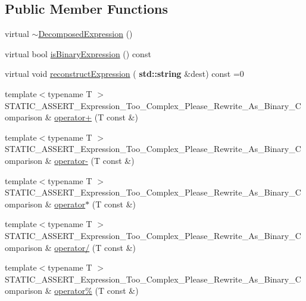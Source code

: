 \subsection*{Public Member Functions}
\begin{DoxyCompactItemize}
\item 
virtual \hyperlink{struct_catch_1_1_decomposed_expression_aa627c69bd83582c33a4d4dcac403936c}{$\sim$\+Decomposed\+Expression} ()
\item 
virtual bool \hyperlink{struct_catch_1_1_decomposed_expression_a1c458ece47b71f093290dbdf9bb31fdb}{is\+Binary\+Expression} () const
\item 
virtual void \hyperlink{struct_catch_1_1_decomposed_expression_a9ce7f356dc96f11f80e40c82f5aa7e55}{reconstruct\+Expression} (\textbf{ std\+::string} \&dest) const =0
\item 
{\footnotesize template$<$typename T $>$ }\\S\+T\+A\+T\+I\+C\+\_\+\+A\+S\+S\+E\+R\+T\+\_\+\+Expression\+\_\+\+Too\+\_\+\+Complex\+\_\+\+Please\+\_\+\+Rewrite\+\_\+\+As\+\_\+\+Binary\+\_\+\+Comparison \& \hyperlink{struct_catch_1_1_decomposed_expression_aa2ce96ce31fef4afb21861bc0276edb9}{operator+} (T const \&)
\item 
{\footnotesize template$<$typename T $>$ }\\S\+T\+A\+T\+I\+C\+\_\+\+A\+S\+S\+E\+R\+T\+\_\+\+Expression\+\_\+\+Too\+\_\+\+Complex\+\_\+\+Please\+\_\+\+Rewrite\+\_\+\+As\+\_\+\+Binary\+\_\+\+Comparison \& \hyperlink{struct_catch_1_1_decomposed_expression_aff39fb5d060abbd018c83b998d32c366}{operator-\/} (T const \&)
\item 
{\footnotesize template$<$typename T $>$ }\\S\+T\+A\+T\+I\+C\+\_\+\+A\+S\+S\+E\+R\+T\+\_\+\+Expression\+\_\+\+Too\+\_\+\+Complex\+\_\+\+Please\+\_\+\+Rewrite\+\_\+\+As\+\_\+\+Binary\+\_\+\+Comparison \& \hyperlink{struct_catch_1_1_decomposed_expression_afb5527e8e3cb8edca5113ec9801249d8}{operator$\ast$} (T const \&)
\item 
{\footnotesize template$<$typename T $>$ }\\S\+T\+A\+T\+I\+C\+\_\+\+A\+S\+S\+E\+R\+T\+\_\+\+Expression\+\_\+\+Too\+\_\+\+Complex\+\_\+\+Please\+\_\+\+Rewrite\+\_\+\+As\+\_\+\+Binary\+\_\+\+Comparison \& \hyperlink{struct_catch_1_1_decomposed_expression_a519d7e2363a92106e46371c9c04044a7}{operator/} (T const \&)
\item 
{\footnotesize template$<$typename T $>$ }\\S\+T\+A\+T\+I\+C\+\_\+\+A\+S\+S\+E\+R\+T\+\_\+\+Expression\+\_\+\+Too\+\_\+\+Complex\+\_\+\+Please\+\_\+\+Rewrite\+\_\+\+As\+\_\+\+Binary\+\_\+\+Comparison \& \hyperlink{struct_catch_1_1_decomposed_expression_a6584335aadaee847c9d06ca8f13a4477}{operator\%} (T const \&)

\end{DoxyCompactItemize}
